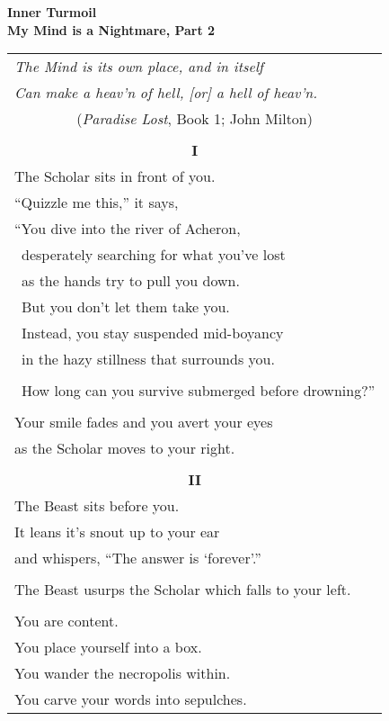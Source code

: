 \documentclass{article}
\begin{document}
\begin{center}
\textbf{Inner Turmoil} \\
{\small\textbf{My Mind is a Nightmare, Part 2}} \\
\vspace*{2ex}
\begin{longtable}{l}
\textit{The Mind is its own place, and in itself} \\
\textit{Can make a heav'n of hell, [or] a hell of heav'n.} \\
\multicolumn{1}{c}{\footnotesize{(\textit{Paradise Lost}, Book 1; John Milton)}} \\
\\
\multicolumn{1}{c}{\textbf{I}} \\
The Scholar sits in front of you. \\
``Quizzle me this,'' it says, \\ %
``You dive into the river of Acheron, \\
\ desperately searching for what you've lost \\
\ as the hands try to pull you down. \\
\ But you don't let them take you. \\
\ Instead, you stay suspended mid-boyancy \\
\ in the hazy stillness that surrounds you. \\
\\
\ How long can you survive submerged before drowning?'' \\
\\
Your smile fades and you avert your eyes \\
as the Scholar moves to your right. \\
\\
\multicolumn{1}{c}{\textbf{II}} \\
The Beast sits before you. \\
It leans it's snout up to your ear \\
and whispers, ``The answer is `forever'.'' \\
\\
The Beast usurps the Scholar which falls to your left. \\
\\
You are content. \\
You place yourself into a box. \\
You wander the necropolis within. \\
You carve your words into sepulches. \\

\end{longtable}
\end{center}
\end{document}
